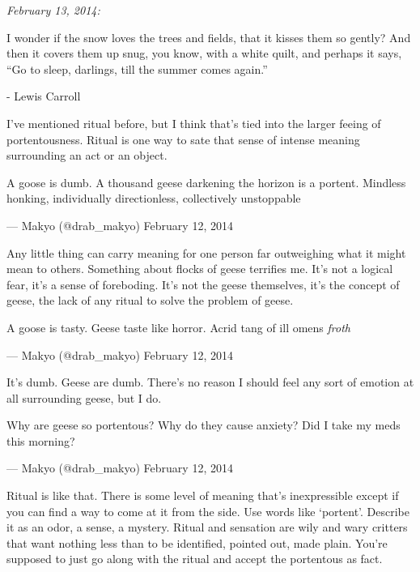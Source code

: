 \emph{February 13, 2014:}

I wonder if the snow loves the trees and fields, that it kisses them so gently? And then it covers them up snug, you know, with a white quilt, and perhaps it says, ``Go to sleep, darlings, till the summer comes again.''

- Lewis Carroll

I've mentioned ritual before, but I think that's tied into the larger feeing of portentousness. Ritual is one way to sate that sense of intense meaning surrounding an act or an object.

A goose is dumb. A thousand geese darkening the horizon is a portent. Mindless honking, individually directionless, collectively unstoppable

--- Makyo (@drab\_makyo) February 12, 2014

Any little thing can carry meaning for one person far outweighing what it might mean to others. Something about flocks of geese terrifies me. It's not a logical fear, it's a sense of foreboding. It's not the geese themselves, it's the concept of geese, the lack of any ritual to solve the problem of geese.

A goose is tasty. Geese taste like horror. Acrid tang of ill omens \emph{froth}

--- Makyo (@drab\_makyo) February 12, 2014

It's dumb. Geese are dumb. There's no reason I should feel any sort of emotion at all surrounding geese, but I do.

Why are geese so portentous? Why do they cause anxiety? Did I take my meds this morning?

--- Makyo (@drab\_makyo) February 12, 2014

Ritual is like that. There is some level of meaning that's inexpressible except if you can find a way to come at it from the side. Use words like `portent'. Describe it as an odor, a sense, a mystery. Ritual and sensation are wily and wary critters that want nothing less than to be identified, pointed out, made plain. You're supposed to just go along with the ritual and accept the portentous as fact.
